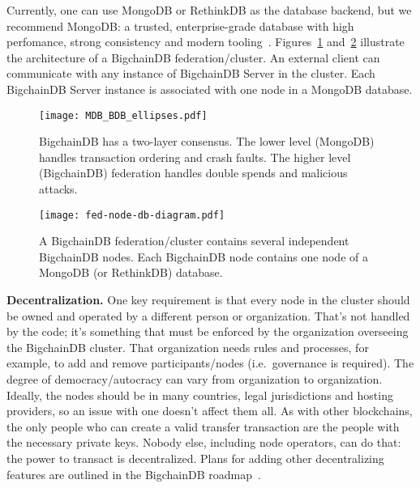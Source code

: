 \documentclass[a4paper]{article}
\begin{document}
Currently, one can use MongoDB or RethinkDB as the database backend,
but we recommend MongoDB:
a trusted, enterprise-grade database with
high perfomance, strong consistency and modern tooling~\cite{mongodb}.
Figures~\ref{fig:system_diagram} and~\ref{fig:federation_node_db} illustrate the architecture
of a BigchainDB federation/cluster.
An external client can communicate with any instance of BigchainDB Server
in the cluster.
Each BigchainDB Server instance is associated with one node
in a MongoDB database.


\begin{figure}[!ht]
  \centering
  \texttt{[image: MDB\_BDB\_ellipses.pdf]}
  \caption{BigchainDB has a two-layer consensus. The lower level (MongoDB) handles transaction ordering and crash faults. The higher level (BigchainDB) federation handles double spends and malicious attacks.}
  \label{fig:system_diagram}
\end{figure}


\begin{figure}[!ht]
  \centering
  \texttt{[image: fed-node-db-diagram.pdf]}
  \caption{A BigchainDB federation/cluster contains several independent BigchainDB nodes. Each BigchainDB node contains one node of a MongoDB (or RethinkDB) database.}
  \label{fig:federation_node_db}
\end{figure}


\noindent \textbf{Decentralization.}
One key requirement is that every node in the cluster should be owned and operated
by a different person or organization.
That's not handled by the code;
it's something that must be enforced by the organization overseeing
the BigchainDB cluster.
That organization needs rules and processes, for example,
to add and remove participants/nodes (i.e.~governance is required).
The degree of democracy/autocracy can vary from organization to organization.
Ideally, the nodes should be in many countries, legal jurisdictions and hosting providers,
so an issue with one doesn't affect them all.
As with other blockchains,
the only people who can create a valid transfer transaction
are the people with the necessary private keys.
Nobody else, including node operators, can do that:
the power to transact is decentralized.
Plans for adding other decentralizing features
are outlined in the BigchainDB roadmap~\cite{bigchaindb_roadmap}.

\vspace{1 em}
\end{document}
